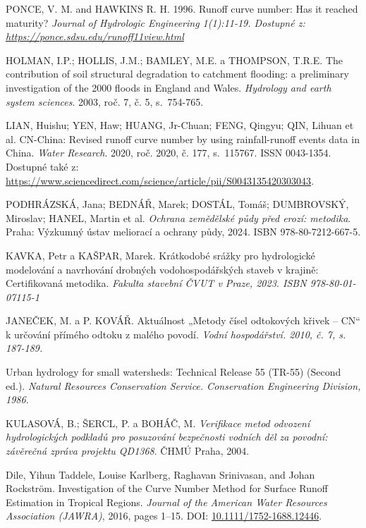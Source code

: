 \documentclass[a4paper,oneside,12pt]{book}
\begin{document}
\begin{thebibliography}{1}
PONCE, V. M. and HAWKINS R. H. 1996. Runoff curve number: Has it reached maturity?
\textit{ Journal of Hydrologic Engineering 1(1):11-19. Dostupné z: \href{https://ponce.sdsu.edu/runoff11view.html}
{https://ponce.sdsu.edu/runoff11view.html}}

HOLMAN, I.P.; HOLLIS, J.M.; BAMLEY, M.E. a THOMPSON, T.R.E. The contribution of soil structural degradation to catchment flooding: a preliminary investigation of the 2000 floods in England and Wales. \textit{Hydrology and earth system sciences}. 2003, roč. 7, č. 5, s.~754-765.

LIAN, Huishu; YEN, Haw; HUANG, Jr-Chuan; FENG, Qingyu; QIN, Lihuan et al. CN-China: Revised runoff curve number by using rainfall-runoff events data in China. \textit{Water Research}. 2020, roč. 2020, č. 177, s.~115767. ISSN 0043-1354. Dostupné také z: \url{https://www.sciencedirect.com/science/article/pii/S0043135420303043}.

PODHRÁZSKÁ, Jana; BEDNÁŘ, Marek; DOSTÁL, Tomáš; DUMBROVSKÝ, Miroslav; HANEL, Martin et al. \textit{Ochrana zemědělské půdy před erozí: metodika}. Praha: Výzkumný ústav meliorací a ochrany půdy, 2024. ISBN 978-80-7212-667-5.

KAVKA, Petr a KAŠPAR, Marek. Krátkodobé srážky pro hydrologické modelování a navrhování drobných vodohospodářských staveb v krajině: Certifikovaná metodika.
\textit{ Fakulta stavební ČVUT v Praze, 2023. ISBN 978-80-01-07115-1}

JANEČEK, M. a P. KOVÁŘ. Aktuálnost „Metody čísel odtokových křivek –
CN“ k určování přímého odtoku z malého povodí.
\textit{ Vodní hospodářství. 2010,
č. 7, s. 187-189.} 

Urban hydrology for small watersheds: Technical Release 55 (TR-55) (Second ed.).
\textit{ Natural Resources Conservation Service. Conservation Engineering Division, 1986.}

KULASOVÁ, B.; ŠERCL, P. a BOHÁČ, M. \textit{Verifikace metod odvození hydrologických podkladů pro posuzování bezpečnosti vodních děl za povodní: závěrečná zpráva projektu QD1368}. ČHMÚ Praha, 2004.



Dile, Yihun Taddele, Louise Karlberg, Raghavan Srinivasan, and Johan Rockström. 
\newblock Investigation of the Curve Number Method for Surface Runoff Estimation in Tropical Regions. 
\newblock \emph{Journal of the American Water Resources Association (JAWRA)}, 2016, pages 1--15. 
\newblock DOI: \href{https://doi.org/10.1111/1752-1688.12446}{10.1111/1752-1688.12446}.


\end{thebibliography}
\end{document}
